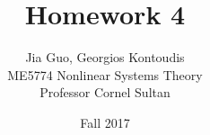 \documentclass[12pt]{article}
\newenvironment{problem}[2][Problem]{\begin{trivlist}
\item[\hskip \labelsep {\bfseries #1}\hskip \labelsep {\bfseries #2.}]}{\end{trivlist}}
\begin{document}
 
 
\title{Homework 4}
\author{Jia Guo, Georgios Kontoudis\\ 
ME5774 Nonlinear Systems Theory\\
Professor Cornel Sultan} 
\date{Fall 2017}
 
\maketitle
\begin{problem}{1} %
\end{problem}
\end{document}
